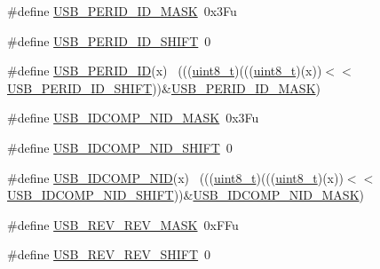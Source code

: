 \begin{DoxyCompactItemize}
\item 
\#define \hyperlink{group___u_s_b___register___masks_ga7c4ef4c7ba738b9ec7ee90c6c482c1e5}{U\+S\+B\+\_\+\+P\+E\+R\+I\+D\+\_\+\+I\+D\+\_\+\+M\+A\+SK}~0x3\+Fu
\item 
\#define \hyperlink{group___u_s_b___register___masks_ga15b2af97cadcb108b2489e2d29e8957e}{U\+S\+B\+\_\+\+P\+E\+R\+I\+D\+\_\+\+I\+D\+\_\+\+S\+H\+I\+FT}~0
\item 
\#define \hyperlink{group___u_s_b___register___masks_ga9866908546596794c6ec34ce8e7ee9ab}{U\+S\+B\+\_\+\+P\+E\+R\+I\+D\+\_\+\+ID}(x)                                                ~(((\hyperlink{_p_e___types_8h_aba7bc1797add20fe3efdf37ced1182c5}{uint8\+\_\+t})(((\hyperlink{_p_e___types_8h_aba7bc1797add20fe3efdf37ced1182c5}{uint8\+\_\+t})(x))$<$$<$\hyperlink{group___u_s_b___register___masks_ga15b2af97cadcb108b2489e2d29e8957e}{U\+S\+B\+\_\+\+P\+E\+R\+I\+D\+\_\+\+I\+D\+\_\+\+S\+H\+I\+FT}))\&\hyperlink{group___u_s_b___register___masks_ga7c4ef4c7ba738b9ec7ee90c6c482c1e5}{U\+S\+B\+\_\+\+P\+E\+R\+I\+D\+\_\+\+I\+D\+\_\+\+M\+A\+SK})
\item 
\#define \hyperlink{group___u_s_b___register___masks_ga91e5cef0c6203ea503c01ecb0f392819}{U\+S\+B\+\_\+\+I\+D\+C\+O\+M\+P\+\_\+\+N\+I\+D\+\_\+\+M\+A\+SK}~0x3\+Fu
\item 
\#define \hyperlink{group___u_s_b___register___masks_gabb5fe5f72dcf289ba2d624ed18f8f07a}{U\+S\+B\+\_\+\+I\+D\+C\+O\+M\+P\+\_\+\+N\+I\+D\+\_\+\+S\+H\+I\+FT}~0
\item 
\#define \hyperlink{group___u_s_b___register___masks_ga45629f99413060a8de87dd44e42f4f31}{U\+S\+B\+\_\+\+I\+D\+C\+O\+M\+P\+\_\+\+N\+ID}(x)                                            ~(((\hyperlink{_p_e___types_8h_aba7bc1797add20fe3efdf37ced1182c5}{uint8\+\_\+t})(((\hyperlink{_p_e___types_8h_aba7bc1797add20fe3efdf37ced1182c5}{uint8\+\_\+t})(x))$<$$<$\hyperlink{group___u_s_b___register___masks_gabb5fe5f72dcf289ba2d624ed18f8f07a}{U\+S\+B\+\_\+\+I\+D\+C\+O\+M\+P\+\_\+\+N\+I\+D\+\_\+\+S\+H\+I\+FT}))\&\hyperlink{group___u_s_b___register___masks_ga91e5cef0c6203ea503c01ecb0f392819}{U\+S\+B\+\_\+\+I\+D\+C\+O\+M\+P\+\_\+\+N\+I\+D\+\_\+\+M\+A\+SK})
\item 
\#define \hyperlink{group___u_s_b___register___masks_ga72a356a066674e41e3827b0ccb931e71}{U\+S\+B\+\_\+\+R\+E\+V\+\_\+\+R\+E\+V\+\_\+\+M\+A\+SK}~0x\+F\+Fu
\item 
\#define \hyperlink{group___u_s_b___register___masks_gab058ebe4be52454e46ef15ce015ac5fd}{U\+S\+B\+\_\+\+R\+E\+V\+\_\+\+R\+E\+V\+\_\+\+S\+H\+I\+FT}~0
\item 

\end{DoxyCompactItemize}
